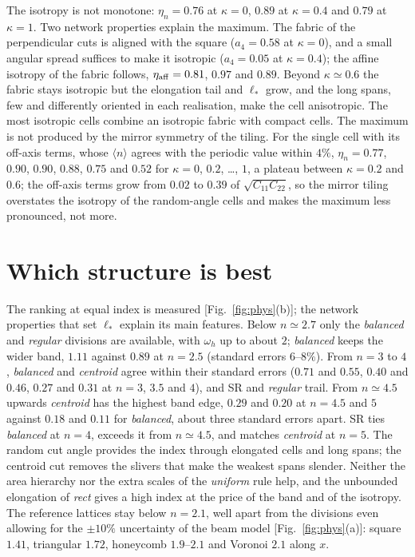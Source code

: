 \documentclass[aps,pre,twocolumn,superscriptaddress,amsmath,amssymb,floatfix]{revtex4-2}
\begin{document}
The isotropy is not monotone: $\eta_n=0.76$ at $\kappa=0$, $0.89$ at $\kappa=0.4$ and
$0.79$ at $\kappa=1$. Two network properties explain the maximum. The fabric of the
perpendicular cuts is aligned with the square ($a_4=0.58$ at $\kappa=0$), and a small
angular spread suffices to make it isotropic ($a_4=0.05$ at $\kappa=0.4$); the affine
isotropy of the fabric follows, $\eta_{\rm aff}=0.81$, $0.97$ and $0.89$. Beyond
$\kappa\simeq0.6$ the fabric stays isotropic but the elongation tail and $\ell_*$ grow, and
the long spans, few and differently oriented in each realisation, make the cell
anisotropic. The most isotropic cells combine an isotropic fabric with compact cells. The
maximum is not produced by the mirror symmetry of the tiling. For the single cell with its
off-axis terms, whose $\langle n\rangle$ agrees with the periodic value within $4\%$,
$\eta_n=0.77$, $0.90$, $0.90$, $0.88$, $0.75$ and $0.52$ for $\kappa=0$, $0.2$, \dots, $1$,
a plateau between $\kappa=0.2$ and $0.6$; the off-axis terms grow from $0.02$ to $0.39$ of
$\sqrt{C_{11}C_{22}}$, so the mirror tiling overstates the isotropy of the random-angle cells
and makes the maximum less pronounced, not more.

\section{Which structure is best}
\label{sec:best}

The ranking at equal index is measured [Fig.~\ref{fig:phys}(b)]; the network properties
that set $\ell_*$ explain its main features. Below $n\simeq2.7$ only the
\emph{balanced} and \emph{regular} divisions are available, with $\omega_h$ up to about $2$;
\emph{balanced} keeps the wider band, $1.11$ against $0.89$ at $n=2.5$ (standard errors
$6$--$8\%$). From $n=3$ to $4$, \emph{balanced} and \emph{centroid} agree within their standard
errors ($0.71$ and $0.55$, $0.40$ and $0.46$, $0.27$ and $0.31$ at $n=3$, $3.5$ and $4$), and SR
and \emph{regular} trail. From $n\simeq4.5$ upwards \emph{centroid} has the highest band edge,
$0.29$ and $0.20$ at $n=4.5$ and $5$ against $0.18$ and $0.11$ for \emph{balanced}, about three
standard errors apart. SR ties \emph{balanced} at $n=4$, exceeds it from $n\simeq4.5$, and
matches \emph{centroid} at $n=5$.
The random cut angle provides the index through elongated cells and long spans; the
centroid cut removes the slivers that make the weakest spans slender. Neither the area
hierarchy nor the extra scales of the \emph{uniform} rule help, and the unbounded
elongation of \emph{rect} gives a high index at the price of the band and of the
isotropy. The reference lattices stay below $n=2.1$, well apart from the divisions even
allowing for the $\pm10\%$ uncertainty of the beam model [Fig.~\ref{fig:phys}(a)]: square
$1.41$, triangular $1.72$, honeycomb $1.9$--$2.1$ and Voronoi $2.1$ along $x$.
\end{document}

